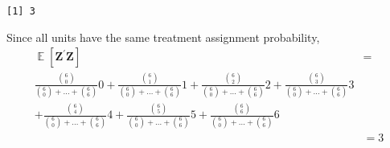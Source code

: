 \documentclass[
  12pt,
  leqno]{article}
\DeclareMathOperator{\E}{\mathbb{E}}
\begin{document}
\begin{verbatim}
[1] 3
\end{verbatim}

Since all units have the same treatment assignment probability,
\begin{align*}
\E\left[\mathbf{Z}^{\prime}\mathbf{Z}\right] & = \\ 
\frac{{6 \choose 0}}{{6 \choose 0} + \dots + {6 \choose 6}}0 + \frac{{6 \choose 1}}{{6 \choose 0} + \dots + {6 \choose 6}}1 + \frac{{6 \choose 2}}{{6 \choose 0} + \dots + {6 \choose 6}}2 + \frac{{6 \choose 3}}{{6 \choose 0} + \dots + {6 \choose 6}}3 \\
+ \frac{{6 \choose 4}}{{6 \choose 0} + \dots + {6 \choose 6}}4 + \frac{{6 \choose 5}}{{6 \choose 0} + \dots + {6 \choose 6}}5  + \frac{{6 \choose 6}}{{6 \choose 0} + \dots + {6 \choose 6}}6 \\
& = 3
\end{align*}
\end{document}
